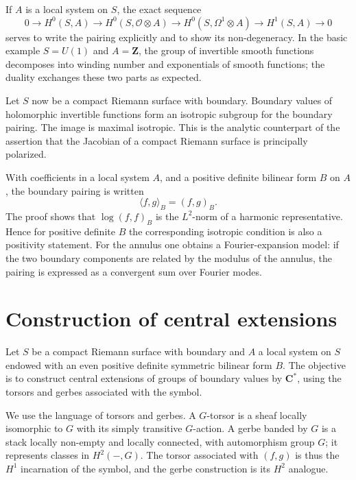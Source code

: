 \documentclass[11pt]{article}
\theoremstyle{remark}
\newcommand{\C}{\mathbf C}
\newcommand{\Z}{\mathbf Z}
\newcommand{\OO}{\mathcal O}
\begin{document}
If $A$ is a local system on $S$, the exact sequence
\begin{equation}\tag{4.7.1}
 0\to H^0(S,A)\to H^0(S,\OO\otimes A)\to H^0(S,\Omega^1\otimes A)\to H^1(S,A)\to0
\end{equation}
serves to write the pairing explicitly and to show its non-degeneracy. In the basic example $S=U(1)$ and $A=\Z$, the group of invertible smooth functions decomposes into winding number and exponentials of smooth functions; the duality exchanges these two parts as expected.

Let $S$ now be a compact Riemann surface with boundary. Boundary values of holomorphic invertible functions form an isotropic subgroup for the boundary pairing. The image is maximal isotropic. This is the analytic counterpart of the assertion that the Jacobian of a compact Riemann surface is principally polarized.

With coefficients in a local system $A$, and a positive definite bilinear form $B$ on $A$, the boundary pairing is written
\begin{equation}\tag{4.16.1}
 \langle f,g\rangle_B=(f,g)_B.
\end{equation}
The proof shows that $\log(f,f)_B$ is the $L^2$-norm of a harmonic representative. Hence for positive definite $B$ the corresponding isotropic condition is also a positivity statement. For the annulus one obtains a Fourier-expansion model: if the two boundary components are related by the modulus of the annulus, the pairing is expressed as a convergent sum over Fourier modes.

\section{Construction of central extensions}

Let $S$ be a compact Riemann surface with boundary and $A$ a local system on $S$ endowed with an even positive definite symmetric bilinear form $B$. The objective is to construct central extensions of groups of boundary values by $\C^*$, using the torsors and gerbes associated with the symbol.

We use the language of torsors and gerbes. A $G$-torsor is a sheaf locally isomorphic to $G$ with its simply transitive $G$-action. A gerbe banded by $G$ is a stack locally non-empty and locally connected, with automorphism group $G$; it represents classes in $H^2(-,G)$. The torsor associated with $(f,g)$ is thus the $H^1$ incarnation of the symbol, and the gerbe construction is its $H^2$ analogue.
\end{document}
